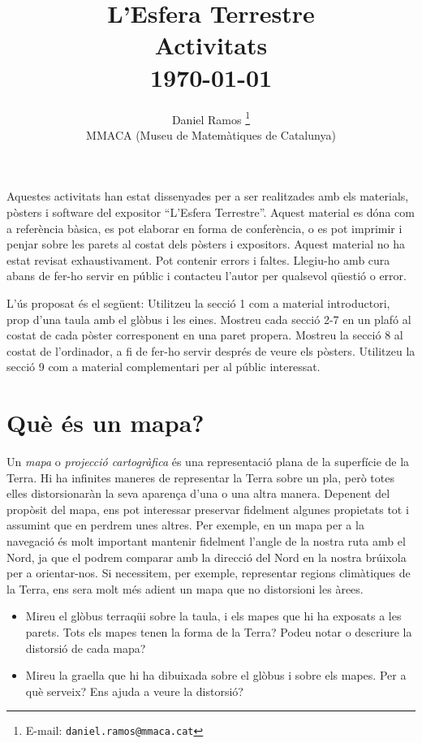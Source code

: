 \documentclass[a4paper,12pt]{article}
\title{L'Esfera Terrestre \\ Activitats \\ {\small \today  } }
\author{Daniel Ramos \footnote{E-mail: \texttt{daniel.ramos@mmaca.cat}}\\MMACA (Museu de Matemàtiques de Catalunya)}
\date{}
\begin{document}
\maketitle \thispagestyle{empty}

Aquestes activitats han estat dissenyades per a ser realitzades amb els materials, pòsters i software del expositor ``L'Esfera Terrestre''. Aquest material es dóna com a referència bàsica, es pot elaborar en forma de conferència, o es pot imprimir i penjar sobre les parets al costat dels pòsters i expositors. Aquest material no ha estat revisat exhaustivament. Pot contenir errors i faltes. Llegiu-ho amb cura abans de fer-ho servir en públic i contacteu l'autor per qualsevol qüestió o error.

\vspace{4em}
L'ús proposat és el següent: Utilitzeu la secció 1 com a material introductori, prop d'una taula amb el glòbus i les eines. Mostreu cada secció 2-7 en un plafó al costat de cada pòster corresponent en una paret propera. Mostreu la secció 8 al costat de l'ordinador, a fi de fer-ho servir després de veure els pòsters. Utilitzeu la secció 9 com a material complementari per al públic interessat.




\newpage
\section{Què és un mapa?}
Un \emph{mapa} o \emph{projecció cartogràfica} és una representació plana de la superfície de la Terra. Hi ha infinites maneres de representar la Terra sobre un pla, però totes elles distorsionaràn la seva aparença d'una o una altra manera. Depenent del propòsit del mapa, ens pot interessar preservar fidelment algunes propietats tot i assumint que en perdrem unes altres. Per exemple, en un mapa per a la navegació és molt important mantenir fidelment l'angle de la nostra ruta amb el Nord, ja que el podrem comparar amb la direcció del Nord en la nostra brúixola per a orientar-nos. Si necessitem, per exemple, representar regions climàtiques de la Terra, ens sera molt més adient un mapa que no distorsioni les àrees.


\begin{itemize}
 \item Mireu el glòbus terraqüi sobre la taula, i els mapes que hi ha exposats a les parets. Tots els mapes tenen la forma de la Terra? Podeu notar o descriure la distorsió de cada mapa? 
 \item Mireu la graella que hi ha dibuixada sobre el glòbus i sobre els mapes. Per a què serveix? Ens ajuda a veure la distorsió?
 
\end{itemize}
\end{document}

